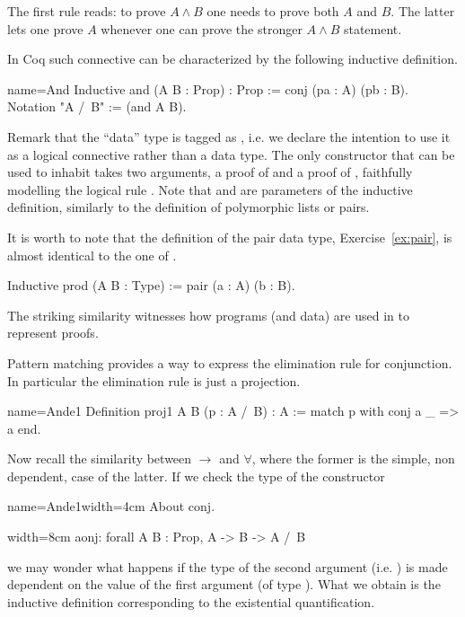 The first rule reads: to prove $A \wedge B$ one needs to prove both
$A$ and $B$.  The latter lets one prove $A$ whenever one can prove
the stronger $A \wedge B$ statement.

In Coq such connective can be characterized by the following
inductive definition.

\begin{coq}{name=And}{}
Inductive and (A B : Prop) : Prop := conj (pa : A) (pb : B).
Notation "A /\ B" := (and A B).
\end{coq}

Remark that the ``data'' type  is tagged as , i.e.  we declare
the intention to use it as a logical connective rather than a data type.  The
only constructor  that can be used to inhabit  takes two
arguments, a proof of  and a proof of , faithfully modelling the
logical rule .  Note that  and  are parameters of the
inductive definition, similarly to the definition of polymorphic lists
or pairs.  

It is worth to note that the definition of the pair data type,
Exercise~\ref{ex:pair}, is almost identical to the one of .

\begin{coq}{}{}
Inductive prod (A B : Type) := pair (a : A) (b : B).
\end{coq}
The striking similarity witnesses how programs (and data) are used in \Coq{}
to represent proofs.

Pattern matching provides a way to express the elimination rule for
conjunction.  In particular the elimination rule is just a projection.

\begin{coq}{name=Ande1}{}
Definition proj1 A B (p : A /\ B) : A :=
  match p with conj a _ => a end.
\end{coq}

Now recall the similarity between $\to$ and $\forall$, where the former is the
simple, non dependent, case of the latter.  If we check the type of
the  constructor

\begin{coq}{name=Ande1}{width=4cm}
About conj. 
\end{coq}
\begin{coqout}{}{width=8cm}
aonj: forall A B : Prop, A -> B -> A /\ B
\end{coqout}
we may wonder what happens if the type of the second argument (i.e. ) is
made dependent on the value of the first argument (of type ).
What we obtain is the inductive definition corresponding to the
existential quantification.

